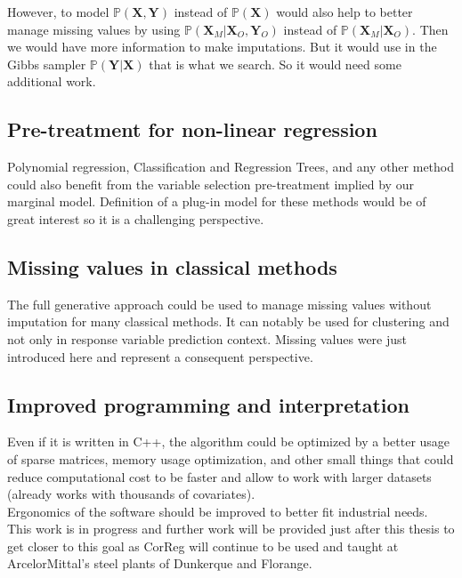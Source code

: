 \documentclass[12pt,a4paper]{report}
\begin{document}
			  
			   However, to model $\mathbb{P}(\boldsymbol{X},\boldsymbol{Y})$ instead of $\mathbb{P}(\boldsymbol{X})$ would also help to better manage missing values by using $\mathbb{P}(\boldsymbol{X}_M|\boldsymbol{X}_O,\boldsymbol{Y}_O)$ instead of $\mathbb{P}(\boldsymbol{X}_M|\boldsymbol{X}_O)$. Then we would have more information to make imputations. But it would use in the Gibbs sampler $\mathbb{P}(\boldsymbol{Y}|\boldsymbol{X})$ that is what we search. So it would need some additional work. 
			   
		\subsection{Pre-treatment for non-linear regression}
			Polynomial regression, Classification and Regression Trees, and any other method could also benefit from the variable selection pre-treatment implied by our marginal model. Definition of a plug-in model for these methods would be of great interest so it is a challenging perspective. 
			\subsection{Missing values in classical methods}
			The full generative approach could be used to manage missing values without imputation for many classical methods.
			It can notably be used for clustering and not only in response variable prediction context.
			Missing values were just introduced here and represent a consequent perspective.
		\subsection{Improved programming and interpretation}
			Even if it is written in C++, the algorithm could be optimized by a better usage of sparse matrices, memory usage optimization, and other small things that could reduce computational cost to be faster and allow to work with larger datasets (already works with thousands of covariates).\\
			Ergonomics of the software should be improved to better fit industrial needs. This work is in progress and further work will be provided just after this thesis to get closer to this goal as {\sc CorReg} will continue to be used and taught at ArcelorMittal's steel plants of Dunkerque and Florange.
			
		
\cleardoublepage
\end{document}
